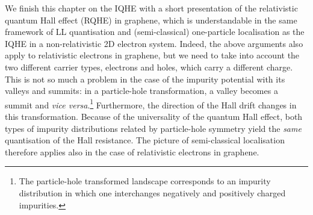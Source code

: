 \documentclass[10pt]{book}
\begin{document}
We finish this chapter on the IQHE with a short presentation of the relativistic quantum Hall effect (RQHE) in graphene,
which is understandable in the same framework of LL quantisation and (semi-classical) one-particle localisation as the 
IQHE in a non-relativistic 2D electron system. Indeed, the above arguments also apply to relativistic electrons in graphene,
but we need to take into account the two different carrier types, electrons and holes, which carry a different charge.
This is not so much a problem in the case of the impurity potential with its valleys and summits: in a particle-hole
transformation, a valley becomes a summit and {\sl vice versa}.\footnote{The particle-hole transformed landscape corresponds
to an impurity distribution in which one interchanges negatively and positively charged impurities. }
Furthermore, the direction of the Hall drift changes in
this transformation. 
Because of the universality of the quantum Hall effect, both types of impurity distributions related by particle-hole
symmetry yield the {\sl same} quantisation of the Hall resistance. 
The picture of semi-classical localisation therefore applies also in the case of relativistic 
electrons in graphene.
\end{document}
